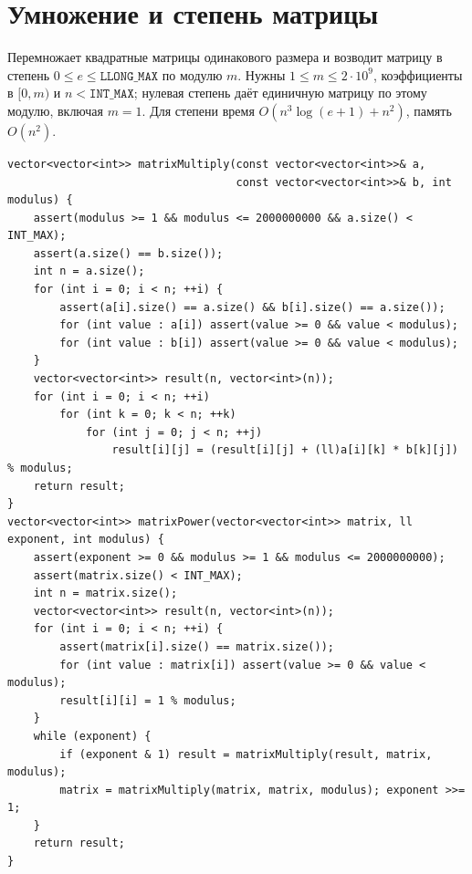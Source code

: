 \section{Умножение и степень матрицы}
Перемножает квадратные матрицы одинакового размера и возводит матрицу в степень $0\le e\le\texttt{LLONG\_MAX}$ по модулю $m$.
Нужны $1\le m\le2\cdot10^9$, коэффициенты в $[0,m)$ и $n<\texttt{INT\_MAX}$; нулевая степень даёт единичную матрицу по этому модулю, включая $m=1$.
Для степени время $O(n^3\log(e+1)+n^2)$, память $O(n^2)$.
\begin{lstlisting}[name=extra_math_matrix_power]
vector<vector<int>> matrixMultiply(const vector<vector<int>>& a,
                                   const vector<vector<int>>& b, int modulus) {
    assert(modulus >= 1 && modulus <= 2000000000 && a.size() < INT_MAX);
    assert(a.size() == b.size());
    int n = a.size();
    for (int i = 0; i < n; ++i) {
        assert(a[i].size() == a.size() && b[i].size() == a.size());
        for (int value : a[i]) assert(value >= 0 && value < modulus);
        for (int value : b[i]) assert(value >= 0 && value < modulus);
    }
    vector<vector<int>> result(n, vector<int>(n));
    for (int i = 0; i < n; ++i)
        for (int k = 0; k < n; ++k)
            for (int j = 0; j < n; ++j)
                result[i][j] = (result[i][j] + (ll)a[i][k] * b[k][j]) % modulus;
    return result;
}
vector<vector<int>> matrixPower(vector<vector<int>> matrix, ll exponent, int modulus) {
    assert(exponent >= 0 && modulus >= 1 && modulus <= 2000000000);
    assert(matrix.size() < INT_MAX);
    int n = matrix.size();
    vector<vector<int>> result(n, vector<int>(n));
    for (int i = 0; i < n; ++i) {
        assert(matrix[i].size() == matrix.size());
        for (int value : matrix[i]) assert(value >= 0 && value < modulus);
        result[i][i] = 1 % modulus;
    }
    while (exponent) {
        if (exponent & 1) result = matrixMultiply(result, matrix, modulus);
        matrix = matrixMultiply(matrix, matrix, modulus); exponent >>= 1;
    }
    return result;
}
\end{lstlisting}
%

